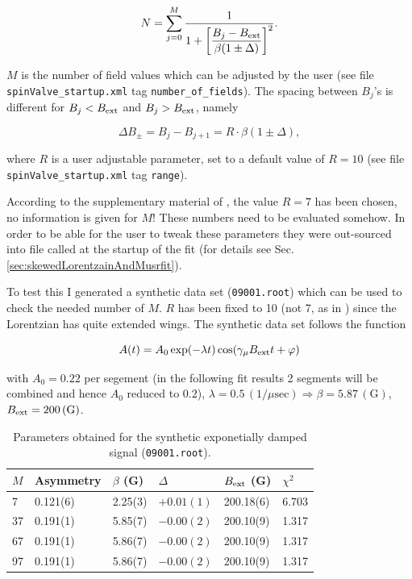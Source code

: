 \documentclass[twoside]{article}
\begin{document}
\begin{equation}\label{eq:skewedLorentzianNorm}
 N = \sum_{j=0}^{M} \frac{1}{1+\left[\displaystyle\frac{B_j-B_{\rm
ext}}{\beta(1\pm\Delta)}\right]^2}.
\end{equation}

\noindent $M$ is the number of field values which can be adjusted by the user
(see file \verb!spinValve_startup.xml! tag \verb!number_of_fields!). 
The spacing between $B_j$'s is different for $B_j<B_{\rm ext}$ and $B_j>B_{\rm
ext}$, namely

\begin{equation}\label{eq:fieldSpacing}
 \Delta B_{\pm} = B_j - B_{j+1} = R \cdot \beta(1\pm\Delta),
\end{equation}

\noindent where $R$ is a user adjustable parameter, set to a default value of
$R=10$ (see file \verb!spinValve_startup.xml! tag \verb!range!). 

According to the supplementary material of \cite{drew2009}, the value $R=7$ has
been chosen, no information is given for $M$! These numbers need to be evaluated
somehow. In order to be able for the user to tweak these parameters they were 
out-sourced into file called at the startup of the fit (for details see Sec.\ref{sec:skewedLorentzainAndMusrfit}).

To test this I generated a synthetic data set (\texttt{09001.root}) which can be used to
check the needed number of $M$. $R$ has been fixed to 10 (not 7, as in \cite{drew2009}) since the Lorentzian has
quite extended wings. The synthetic data set follows the function

\begin{equation}\label{eq:syntheticData}
 A(t) = A_0 \exp(-\lambda t) \cos(\gamma_\mu B_{\rm ext} t + \varphi)
\end{equation}

\noindent with $A_0=0.22$ per segement (in the following fit results 2 segments will be combined and hence $A_0$ reduced to $0.2$), 
$\lambda = 0.5\, (1/\mu\mathrm{sec}) \Rightarrow \beta = 5.87\, (\mathrm{G})$, $B_{\rm ext} = 200\,(\mathrm{G})$.

\begin{table}[h]
 \centering
 \begin{tabular}{l|l|l|l|l|l}
   $M$ & Asymmetry & $\beta$ (G) & $\Delta$   & $B_{\rm ext}$ (G) & $\chi^2$ \\ \hline\hline
    7  & 0.121(6)  & 2.25(3)     & $+0.01(1)$ & 200.18(6)         & 6.703 \\
   37  & 0.191(1)  & 5.85(7)     & $-0.00(2)$ & 200.10(9)         & 1.317 \\
   67  & 0.191(1)  & 5.86(7)     & $-0.00(2)$ & 200.10(9)         & 1.317 \\
   97  & 0.191(1)  & 5.86(7)     & $-0.00(2)$ & 200.10(9)         & 1.317
 \end{tabular}
 \caption{Parameters obtained for the synthetic exponetially damped signal (\texttt{09001.root}).}\label{tab:syntheticData}
\end{table}
\end{document}

